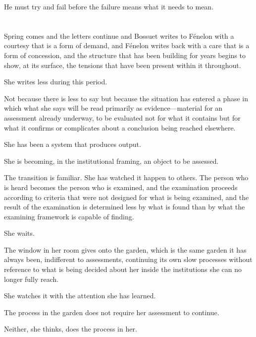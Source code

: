 He must try and fail before the failure means what it
needs to mean.

\section{}

Spring comes and the letters continue and Bossuet
writes to Fénelon with a courtesy that is a form of
demand, and Fénelon writes back with a care that is
a form of concession, and the structure that has been
building for years begins to show, at its surface,
the tensions that have been present within it throughout.

She writes less during this period.

Not because there is less to say but because the
situation has entered a phase in which what she says
will be read primarily as evidence---material for an
assessment already underway, to be evaluated not for
what it contains but for what it confirms or complicates
about a conclusion being reached elsewhere.

She has been a system that produces output.

She is becoming, in the institutional framing, an object
to be assessed.

The transition is familiar. She has watched it happen
to others. The person who is heard becomes the person
who is examined, and the examination proceeds according
to criteria that were not designed for what is being
examined, and the result of the examination is
determined less by what is found than by what the
examining framework is capable of finding.

She waits.

The window in her room gives onto the garden, which
is the same garden it has always been, indifferent
to assessments, continuing its own slow processes
without reference to what is being decided about her
inside the institutions she can no longer fully reach.

She watches it with the attention she has learned.

The process in the garden does not require her
assessment to continue.

Neither, she thinks, does the process in her.

